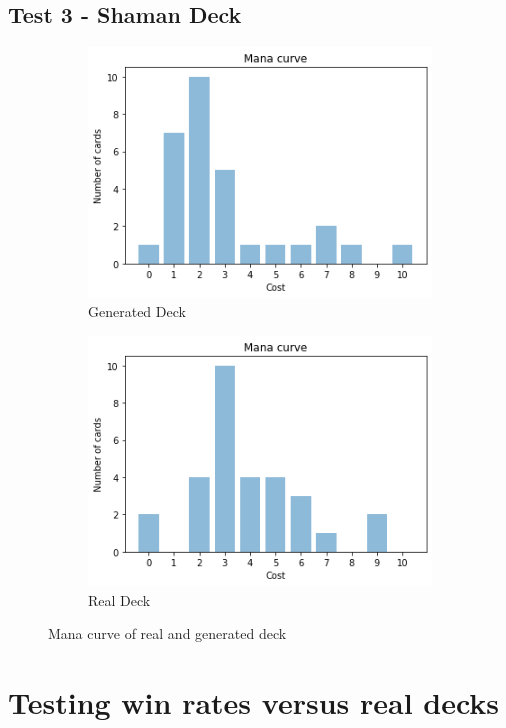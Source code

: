 \documentclass{report} %
\begin{document}
\subsection{Test 3 - Shaman Deck}
\begin{figure}[H]
\centering
\begin{subfigure}{.5\textwidth}
 \centering
 \includegraphics[width=.75\linewidth]{TestImages/ShamanDeckManaCurveFake}
 \caption{Generated Deck}
\end{subfigure}%
\begin{subfigure}{.5\textwidth}
 \centering
 \includegraphics[width=.75\linewidth]{TestImages/ShamanDeckManaCurveReal}
 \caption{Real Deck}
\end{subfigure}
\caption{Mana curve of real and generated deck}
\end{figure}
\section{Testing win rates versus real decks}
\end{document}
